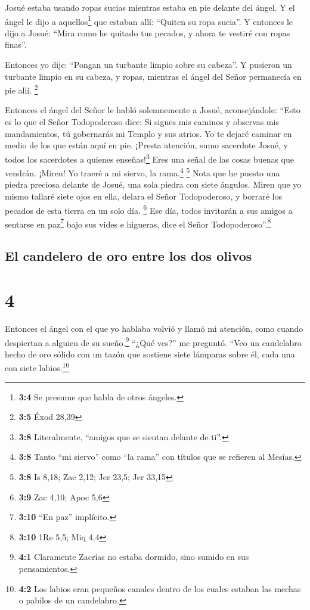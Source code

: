 Josué estaba usando ropas sucias mientras estaba en pie
delante del ángel.  Y el ángel le dijo a
aquellos\footnote{\textbf{3:4} Se presume que habla de otros ángeles.}
que estaban allí: ``Quiten su ropa sucia''. Y entonces le dijo a Josué:
``Mira como he quitado tus pecados, y ahora te vestiré con ropas
finas''.

 Entonces yo dije: ``Pongan un turbante limpio sobre su
cabeza''. Y pusieron un turbante limpio en su cabeza, y ropas, mientras
el ángel del Señor permanecía en pie allí. \footnote{\textbf{3:5} Éxod
  28,39}

 Entonces el ángel del Señor le habló solemnemente a
Josué, aconsejándole:  ``Esto es lo que el Señor
Todopoderoso dice: Si sigues mis caminos y observas mis mandamientos, tú
gobernarás mi Templo y sus atrios. Yo te dejaré caminar en medio de los
que están aquí en pie.  ¡Presta atención, sumo sacerdote
Josué, y todos los sacerdotes a quienes enseñas!\footnote{\textbf{3:8}
  Literalmente, ``amigos que se sientan delante de ti''.} Eres una señal
de las cosas buenas que vendrán. ¡Miren! Yo traeré a mi siervo, la
rama.\footnote{\textbf{3:8} Tanto ``mi siervo'' como ``la rama'' con
  títulos que se refieren al Mesías.} \footnote{\textbf{3:8} Is 8,18;
  Zac 2,12; Jer 23,5; Jer 33,15}  Nota que he puesto una
piedra preciosa delante de Josué, una sola piedra con siete ángulos.
Miren que yo mismo tallaré siete ojos en ella, delara el Señor
Todopoderoso, y borraré los pecados de esta tierra en un solo día.
\footnote{\textbf{3:9} Zac 4,10; Apoc 5,6}  Ese día,
todos invitarán a sus amigos a sentarse en paz\footnote{\textbf{3:10}
  ``En paz'' implícito.} bajo sus vides e higueras, dice el Señor
Todopoderoso''.\footnote{\textbf{3:10} 1Re 5,5; Miq 4,4}

\hypertarget{el-candelero-de-oro-entre-los-dos-olivos}{%
\subsection{El candelero de oro entre los dos
olivos}\label{el-candelero-de-oro-entre-los-dos-olivos}}

\hypertarget{section-3}{%
\section{4}\label{section-3}}

 Entonces el ángel con el que yo hablaba volvió y llamó mi
atención, como cuando despiertan a alguien de su sueño.\footnote{\textbf{4:1}
  Claramente Zacrías no estaba dormido, sino sumido en sus pensamientos.}
 ``¿Qué ves?'' me preguntó. ``Veo un candelabro hecho de
oro sólido con un tazón que sostiene siete lámparas sobre él, cada una
con siete labios.\footnote{\textbf{4:2} Los labios eran pequeños canales
  dentro de los cuales estaban las mechas o pabilos de un candelabro.}

